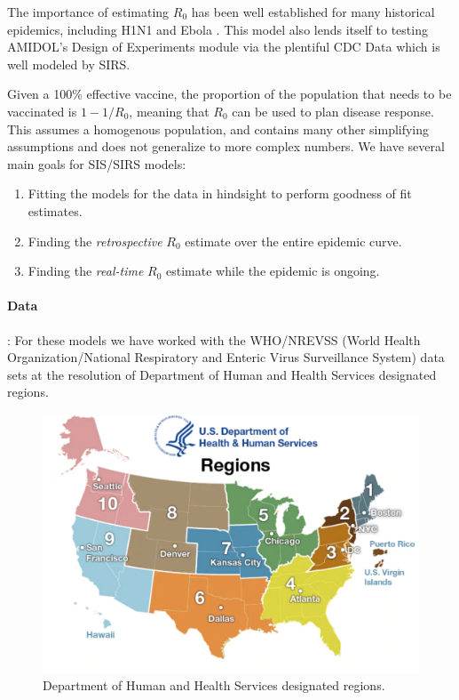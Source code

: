 \documentclass[11pt]{article}
\newcommand{\amidol}{\textsc{AMIDOL}}
\begin{document}
The importance of estimating $R_0$ has been well established for many historical epidemics, including H1N1 \cite{fraser2009pandemic} and Ebola \cite{fisman2014early}.  This model also lends itself to testing \amidol{}'s Design of Experiments module via the plentiful CDC Data \cite{cdc2019fluview} which is well modeled by SIRS.

Given a 100\% effective vaccine, the proportion of the population that needs to be vaccinated is $1 - 1/R_0$, meaning that $R_0$ can be used to plan disease response.  This assumes a homogenous population, and contains many other simplifying assumptions and does not generalize to more complex numbers.  We have several main goals for SIS/SIRS models:

\begin{enumerate}
\item Fitting the models for the data in hindsight to perform goodness of fit estimates.
\item Finding the \emph{retrospective} $R_0$ estimate over the entire epidemic curve.
\item Finding the \emph{real-time} $R_0$ estimate while the epidemic is ongoing.
\end{enumerate}

\paragraph{Data}: For these models we have worked with the WHO/NREVSS (World Health Organization/National Respiratory and Enteric Virus Surveillance System) data sets at the resolution of Department of Human and Health Services designated regions.

\begin{figure}
\includegraphics[width=\textwidth]{figs/regionsmap.pdf}
\caption{Department of Human and Health Services designated regions.}
\label{Fig:Regions}
\end{figure}
\end{document}
